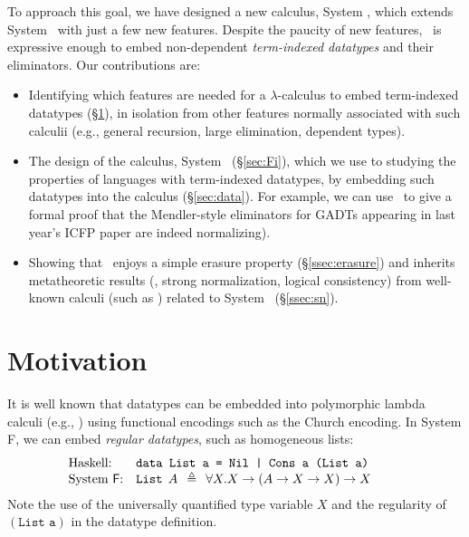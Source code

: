 To approach this goal, we have designed a new calculus, System \Fi,
which extends System \Fw\ with just a few new features. Despite
the paucity of new features, \Fi\
is expressive enough to embed non-dependent \emph{term-indexed datatypes}
and their eliminators. Our contributions are:\vspace*{-5pt}
\begin{itemize}
\item Identifying which features are needed for a $\lambda$-calculus
    to embed term-indexed datatypes (\S\ref{sec:motiv}),
    in isolation from other features normally associated with such calculii
    (e.g., general recursion, large elimination, dependent types).
    \vspace*{-1pt}
\item The design of the calculus, System \Fi\ (\S\ref{sec:Fi}), which we
    use to studying the properties of languages with term-indexed datatypes,
    by embedding such datatypes into the calculus (\S\ref{sec:data}).
    For example, we can use \Fi\ to give a formal proof that the 
    Mendler-style eliminators
    for GADTs appearing in last year's ICFP paper \cite{AhnShe11} are
    indeed normalizing).
    \vspace*{-1pt}
\item Showing that \Fi\ enjoys a simple erasure property
    (\S\ref{ssec:erasure}) and inherits metatheoretic results
    (\eg, strong normalization, logical consistency)
    from well-known calculi (such as \Fw) related to System \Fi\ (\S\ref{ssec:sn}).
\end{itemize}\vspace*{-3pt}


\section{Motivation}
\label{sec:motiv}
It is well known that datatypes can be embedded into polymorphic lambda calculi
(e.g., \cite{AbeMatUus03}) using
functional encodings such as the Church encoding.
In System \textsf{F}, we can embed \emph{regular datatypes},
such as homogeneous lists:
\[\!\!\!\!\!\!\!\!\!
\begin{array}{ll}
\text{Haskell:} & \texttt{data List a = Nil | Cons a (List a)} \\
\text{System \textsf{F}:} & \texttt{{List}}\:\: A\:\:\triangleq\:\:\forall X.X\to(A\to X\to X)\to X ~~\;
\end{array}
\]
Note the use of the universally quantified type variable $X$
and the regularity of $(\texttt{List a})$ in the datatype definition.

